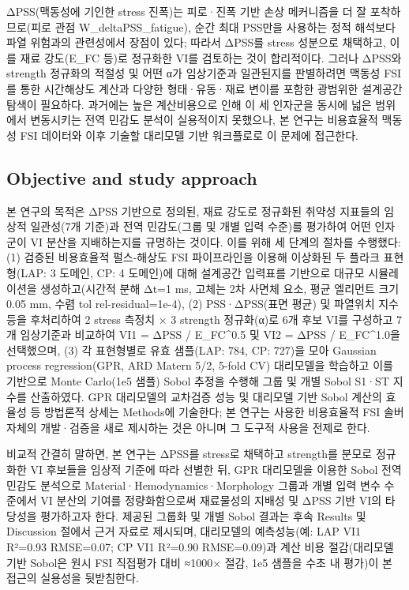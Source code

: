 \documentclass[preprint,12pt]{elsarticle}
\begin{document}
ΔPSS(맥동성에 기인한 stress 진폭)는 피로·진폭 기반 손상 메커니즘을 더 잘 포착하므로(피로 관점 W\_deltaPSS\_fatigue), 순간 최대 PSS만을 사용하는 정적 해석보다 파열 위험과의 관련성에서 장점이 있다; 따라서 ΔPSS를 stress 성분으로 채택하고, 이를 재료 강도(E\_FC 등)로 정규화한 VI를 검토하는 것이 합리적이다. 그러나 ΔPSS와 strength 정규화의 적절성 및 어떤 α가 임상기준과 일관된지를 판별하려면 맥동성 FSI를 통한 시간해상도 계산과 다양한 형태·유동·재료 변이를 포함한 광범위한 설계공간 탐색이 필요하다. 과거에는 높은 계산비용으로 인해 이 세 인자군을 동시에 넓은 범위에서 변동시키는 전역 민감도 분석이 실용적이지 못했으나, 본 연구는 비용효율적 맥동성 FSI 데이터와 이후 기술할 대리모델 기반 워크플로로 이 문제에 접근한다.

\subsection{Objective and study approach}
본 연구의 목적은 ΔPSS 기반으로 정의된, 재료 강도로 정규화된 취약성 지표들의 임상적 일관성(7개 기준)과 전역 민감도(그룹 및 개별 입력 수준)를 평가하여 어떤 인자군이 VI 분산을 지배하는지를 규명하는 것이다. 이를 위해 세 단계의 절차를 수행했다: (1) 검증된 비용효율적 펄스-해상도 FSI 파이프라인을 이용해 이상화된 두 플라크 표현형(LAP: 3 도메인, CP: 4 도메인)에 대해 설계공간 입력표를 기반으로 대규모 시뮬레이션을 생성하고(시간적 분해 Δt=1 ms, 고체는 2차 사면체 요소, 평균 엘리먼트 크기 0.05 mm, 수렴 tol rel-residual=1e-4), (2) PSS·ΔPSS(표면 평균) 및 파열위치 지수 등을 후처리하여 2 stress 측정치 × 3 strength 정규화(α)로 6개 후보 VI를 구성하고 7개 임상기준과 비교하여 VI1 = ΔPSS / E\_FC\textasciicircum {0.5} 및 VI2 = ΔPSS / E\_FC\textasciicircum {1.0}을 선택했으며, (3) 각 표현형별로 유효 샘플(LAP: 784, CP: 727)을 모아 Gaussian process regression(GPR, ARD Matern 5/2, 5-fold CV) 대리모델을 학습하고 이를 기반으로 Monte Carlo(1e5 샘플) Sobol 추정을 수행해 그룹 및 개별 Sobol S1·ST 지수를 산출하였다. GPR 대리모델의 교차검증 성능 및 대리모델 기반 Sobol 계산의 효율성 등 방법론적 상세는 Methods에 기술한다; 본 연구는 사용한 비용효율적 FSI 솔버 자체의 개발·검증을 새로 제시하는 것은 아니며 그 도구적 사용을 전제로 한다.

비교적 간결히 말하면, 본 연구는 ΔPSS를 stress로 채택하고 strength를 분모로 정규화한 VI 후보들을 임상적 기준에 따라 선별한 뒤, GPR 대리모델을 이용한 Sobol 전역 민감도 분석으로 Material·Hemodynamics·Morphology 그룹과 개별 입력 변수 수준에서 VI 분산의 기여를 정량화함으로써 재료물성의 지배성 및 ΔPSS 기반 VI의 타당성을 평가하고자 한다. 제공된 그룹화 및 개별 Sobol 결과는 후속 Results 및 Discussion 절에서 근거 자료로 제시되며, 대리모델의 예측성능(예: LAP VI1 R²=0.93 RMSE=0.07; CP VI1 R²=0.90 RMSE=0.09)과 계산 비용 절감(대리모델 기반 Sobol은 원시 FSI 직접평가 대비 ≈1000× 절감, 1e5 샘플을 수초 내 평가)이 본 접근의 실용성을 뒷받침한다.
\end{document}
